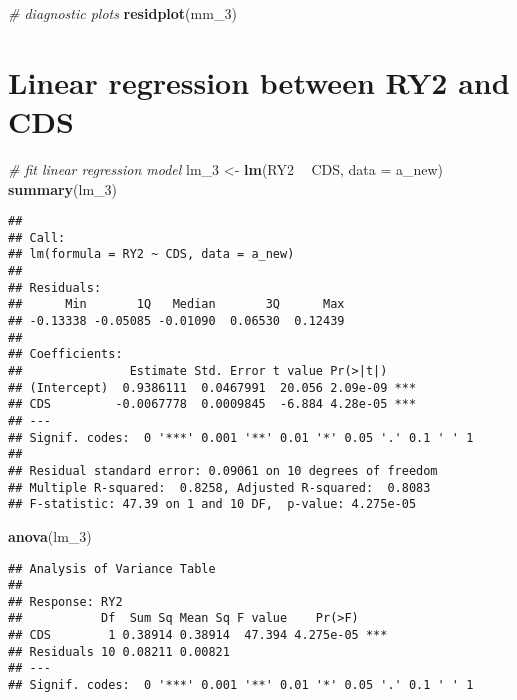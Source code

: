 \documentclass[]{book}
\newenvironment{Shaded}{\begin{snugshade}}{\end{snugshade}}
\newcommand{\CommentTok}[1]{\textcolor[rgb]{0.56,0.35,0.01}{\textit{#1}}}
\newcommand{\DataTypeTok}[1]{\textcolor[rgb]{0.13,0.29,0.53}{#1}}
\newcommand{\DecValTok}[1]{\textcolor[rgb]{0.00,0.00,0.81}{#1}}
\newcommand{\KeywordTok}[1]{\textcolor[rgb]{0.13,0.29,0.53}{\textbf{#1}}}
\newcommand{\NormalTok}[1]{#1}
\newcommand{\OperatorTok}[1]{\textcolor[rgb]{0.81,0.36,0.00}{\textbf{#1}}}
\newcommand{\StringTok}[1]{\textcolor[rgb]{0.31,0.60,0.02}{#1}}
\begin{document}
\begin{Shaded}
\begin{Highlighting}[]
\CommentTok{# diagnostic plots  }
\KeywordTok{residplot}\NormalTok{(mm_}\DecValTok{3}\NormalTok{)}
\end{Highlighting}
\end{Shaded}

\hypertarget{linear-regression-between-ry2-and-cds}{%
\section{Linear regression between RY2 and CDS}\label{linear-regression-between-ry2-and-cds}}

\begin{Shaded}
\begin{Highlighting}[]
\CommentTok{# fit linear regression model}
\NormalTok{lm_}\DecValTok{3}\NormalTok{ <-}\StringTok{ }\KeywordTok{lm}\NormalTok{(RY2 }\OperatorTok{~}\StringTok{ }\NormalTok{CDS, }\DataTypeTok{data =}\NormalTok{ a_new)}
\KeywordTok{summary}\NormalTok{(lm_}\DecValTok{3}\NormalTok{)}
\end{Highlighting}
\end{Shaded}

\begin{verbatim}
## 
## Call:
## lm(formula = RY2 ~ CDS, data = a_new)
## 
## Residuals:
##      Min       1Q   Median       3Q      Max 
## -0.13338 -0.05085 -0.01090  0.06530  0.12439 
## 
## Coefficients:
##               Estimate Std. Error t value Pr(>|t|)    
## (Intercept)  0.9386111  0.0467991  20.056 2.09e-09 ***
## CDS         -0.0067778  0.0009845  -6.884 4.28e-05 ***
## ---
## Signif. codes:  0 '***' 0.001 '**' 0.01 '*' 0.05 '.' 0.1 ' ' 1
## 
## Residual standard error: 0.09061 on 10 degrees of freedom
## Multiple R-squared:  0.8258, Adjusted R-squared:  0.8083 
## F-statistic: 47.39 on 1 and 10 DF,  p-value: 4.275e-05
\end{verbatim}

\begin{Shaded}
\begin{Highlighting}[]
\KeywordTok{anova}\NormalTok{(lm_}\DecValTok{3}\NormalTok{)}
\end{Highlighting}
\end{Shaded}

\begin{verbatim}
## Analysis of Variance Table
## 
## Response: RY2
##           Df  Sum Sq Mean Sq F value    Pr(>F)    
## CDS        1 0.38914 0.38914  47.394 4.275e-05 ***
## Residuals 10 0.08211 0.00821                      
## ---
## Signif. codes:  0 '***' 0.001 '**' 0.01 '*' 0.05 '.' 0.1 ' ' 1
\end{verbatim}
\end{document}
